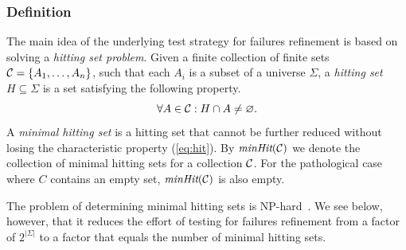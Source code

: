 \subsubsection*{Definition}
The main idea of the underlying test strategy for failures refinement is
based on solving a \emph{hitting set problem}. Given a finite collection of
finite sets ${\cal C} = \{ A_1,\dots,A_n\}$, such that each $A_i$ is a subset of a
universe $\Sigma$, a \emph{hitting set} $H\subseteq\Sigma$ is a set
satisfying the following property.
%
\begin{equation}
  \label{eq:hit}
  \forall A\in {\cal C}: H\cap A \neq\varnothing.
\end{equation}
%
A \emph{minimal hitting set} is a hitting set that cannot be further reduced
without losing the characteristic property (\ref{eq:hit}). By $\text{\it minHit}({\cal C})$
we denote the collection of minimal hitting sets for a collection ${\cal C}$. For
the pathological case where $C$ contains an empty set, $\text{\it minHit}({\cal C})$ is also
empty.

The problem of determining minimal hitting sets is %
NP-hard~\cite{5533149}. We see below, however, that it reduces the effort of
testing for failures refinement from a factor of $2^{|\Sigma|}$ to a factor
that equals the number of minimal hitting sets.


